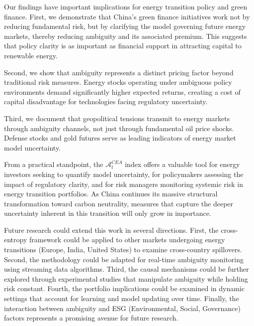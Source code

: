 \documentclass[preprint,12pt,authoryear]{elsarticle}
\begin{document}
Our findings have important implications for energy transition policy and green finance. First, we demonstrate that China's green finance initiatives work not by reducing fundamental risk, but by clarifying the model governing future energy markets, thereby reducing ambiguity and its associated premium. This suggests that policy clarity is as important as financial support in attracting capital to renewable energy.

Second, we show that ambiguity represents a distinct pricing factor beyond traditional risk measures. Energy stocks operating under ambiguous policy environments demand significantly higher expected returns, creating a cost of capital disadvantage for technologies facing regulatory uncertainty.

Third, we document that geopolitical tensions transmit to energy markets through ambiguity channels, not just through fundamental oil price shocks. Defense stocks and gold futures serve as leading indicators of energy market model uncertainty.

From a practical standpoint, the $\mathcal{A}^{CEA}_t$ index offers a valuable tool for energy investors seeking to quantify model uncertainty, for policymakers assessing the impact of regulatory clarity, and for risk managers monitoring systemic risk in energy transition portfolios. As China continues its massive structural transformation toward carbon neutrality, measures that capture the deeper uncertainty inherent in this transition will only grow in importance.

Future research could extend this work in several directions. First, the cross-entropy framework could be applied to other markets undergoing energy transitions (Europe, India, United States) to examine cross-country spillovers. Second, the methodology could be adapted for real-time ambiguity monitoring using streaming data algorithms. Third, the causal mechanisms could be further explored through experimental studies that manipulate ambiguity while holding risk constant. Fourth, the portfolio implications could be examined in dynamic settings that account for learning and model updating over time. Finally, the interaction between ambiguity and ESG (Environmental, Social, Governance) factors represents a promising avenue for future research.



\end{document}
